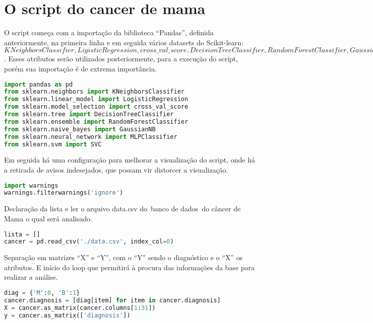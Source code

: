\chapter{O script do cancer de mama}
\label{chapter:o_script_do_cancer_de_mama}

O script começa com a importação da biblioteca “Pandas”, definida anteriormente, na primeira linha e em seguida vários datasets do Scikit-learn: 
$KNeighborsClassifier, LigisticRegression, cross\_val\_score, DecisionTreeClassifier, RandomForestClassifier, GaussianNB, MLPClassifier$. 
Esses atributos serão utilizados posteriormente, para a execução do script, porém sua importação é de extrema importância.


\begin{lstlisting}[language=Python, caption=Importação de bibliotecas]
import pandas as pd
from sklearn.neighbors import KNeighborsClassifier
from sklearn.linear_model import LogisticRegression
from sklearn.model_selection import cross_val_score
from sklearn.tree import DecisionTreeClassifier
from sklearn.ensemble import RandomForestClassifier
from sklearn.naive_bayes import GaussianNB
from sklearn.neural_network import MLPClassifier
from sklearn.svm import SVC
\end{lstlisting}

Em seguida há uma configuração para melhorar a visualização do script, onde há a retirada de avisos indesejados, que possam vir distorcer a visualização.

\begin{lstlisting}[language=Python, caption=Ignorar Avisos]
import warnings
warnings.filterwarnings('ignore')
\end{lstlisting}

Declaração da lista e ler o arquivo data.csv do banco de dados do câncer de Mama o qual será analisado.
\begin{lstlisting}[language=Python, caption=Ler arquivo data.csv]
lista = []
cancer = pd.read_csv('./data.csv', index_col=0)
\end{lstlisting}

Separação em matrizes “X” e “Y”, com o “Y” sendo o diagnóstico e o “X” os atributos. E início do loop que permitirá à procura das informações da base para realizar a análise.
\begin{lstlisting}[language=Python, caption=Separar matrizes]
diag = {'M':0, 'B':1}
cancer.diagnosis = [diag[item] for item in cancer.diagnosis]
X = cancer.as_matrix(cancer.columns[1:31])
y = cancer.as_matrix(['diagnosis'])
\end{lstlisting}



